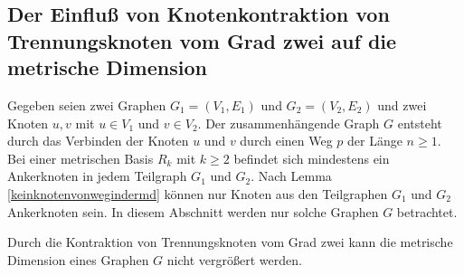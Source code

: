 \subsection{Der Einfluß von Knotenkontraktion von Trennungsknoten vom Grad zwei auf die metrische Dimension}
Gegeben seien zwei Graphen $G_1=(V_1,E_1)$ und $G_2=(V_2,E_2)$ und zwei Knoten $u,v$ mit $u \in V_1$ und $v\in V_2$.
Der zusammenhängende Graph $G$ entsteht durch das Verbinden der Knoten $u$ und $v$ durch einen Weg $p$ der Länge $n \geq 1$. Bei einer metrischen Basis $R_k$ mit $k \geq 2$ befindet sich mindestens ein Ankerknoten in jedem Teilgraph $G_1$ und $G_2$. Nach Lemma \ref{keinknotenvonwegindermd} können nur Knoten aus den Teilgraphen $G_1$ und $G_2$ Ankerknoten sein. In diesem Abschnitt werden nur solche Graphen $G$ betrachtet.
\begin{lem}
\label{lem2}
\label{sepvertex}
Durch die Kontraktion von Trennungsknoten vom Grad zwei kann die metrische Dimension eines Graphen $G$ nicht vergrößert werden.
\end{lem}
